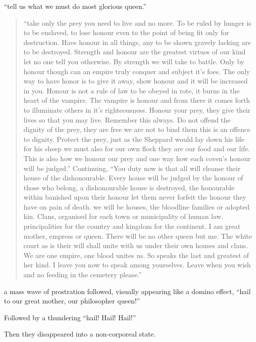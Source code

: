 ``tell us what we must do most glorious queen.''
\begin{quotation}
	``take only the prey you need to live and no more. To be ruled by hunger is to be enslaved, to lose honour even to the point of being fit only for destruction. Have honour in all things, any to be shown gravely lacking are to be destroyed. Strength and honour are the greatest virtues of our kind let no one tell you otherwise. By strength we will take to battle. Only by honour though can an empire truly conquer and subject it's foes. The only way to have honor is to give it away, show honour and it will be increased in you. Honour is not a rule of law to be obeyed in rote, it burns in the heart of the vampire. The vampire is honour and from there it comes forth to illuminate others in it's righteousness. Honour your prey, they give their lives so that you may live. Remember this always. Do not offend the dignity of the prey, they are free we are not to bind them this is an offence to dignity. Protect the prey, just as the Sheppard would lay down his life for his sheep we must also for our own flock they are our food and our life. This is also how we honour our prey and one way how each coven's honour will be judged.''
	Continuing, ``You duty now is that all will cleanse their house of the dishonourable. Every house will be judged  by the honour of those who belong, a dishonourable house is destroyed, the honourable within banished upon their honour let them never forfeit the honour they have on pain of death. we will be houses, the bloodline families or adopted kin. Clans, organised for each town or municipality of human law. principalities for the country and kingdom for the continent. I am great mother, empress or queen. There will be no other queen but me. The white court as is their will shall unite with us under their own houses and clans. We are one empire, one blood unites us. So speaks the last and greatest of her kind. I leave you now to speak among yourselves. Leave when you wish and no feeding in the cemetery please.''
\end{quotation}

a mass wave of prostration followed, visually appearing like a domino effect, ``hail to our great mother, our philosopher queen!'' 

Followed by a thundering ``hail! Hail! Hail!'' 

Then they disappeared into a non-corporeal state. 

